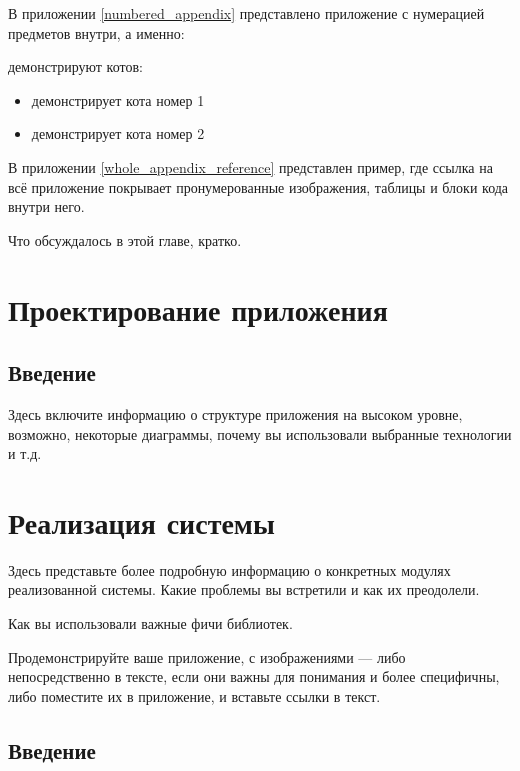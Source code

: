 \documentclass[a4paper,12pt]{report}
\begin{document}
В приложении \ref{numbered_appendix} представлено приложение с нумерацией предметов внутри,
а именно:

 демонстрируют котов:
\begin{itemize}
  \item {} демонстрирует кота номер 1
  \item {} демонстрирует кота номер 2
\end{itemize}

В приложении \ref{whole_appendix_reference} представлен пример, где
ссылка на всё приложение покрывает пронумерованные изображения, таблицы и блоки кода внутри него.


Что обсуждалось в этой главе, кратко.

\chapter{Проектирование приложения}\label{architecture_chapter_title}

\section{Введение}

Здесь включите информацию о структуре приложения на высоком уровне,
возможно, некоторые диаграммы, почему вы использовали выбранные технологии и т.д.


\chapter{Реализация системы}\label{implementation_chapter_title}

Здесь представьте более подробную информацию о конкретных модулях реализованной системы.
Какие проблемы вы встретили и как их преодолели.

Как вы использовали важные фичи библиотек.

Продемонстрируйте ваше приложение, с изображениями — либо непосредственно в тексте,
если они важны для понимания и более специфичны,
либо поместите их в приложение, и вставьте ссылки в текст.

\section{Введение}
\end{document}
